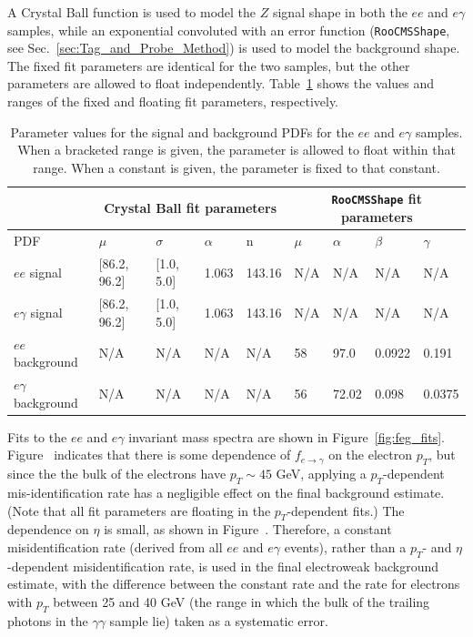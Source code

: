 \documentclass[dissertation_bw.tex]{subfiles}
\begin{document}
A Crystal Ball function is used to model the $Z$ signal shape in both the $ee$ and $e\gamma$ samples, while an exponential convoluted with an error function (\verb+RooCMSShape+, see Sec.~\ref{sec:Tag_and_Probe_Method}) is used to model the background shape.  The fixed fit parameters are identical for the two samples, but the other parameters are allowed to float independently.  Table~\ref{tab:feg_fit_parameters} shows the values and ranges of the fixed and floating fit parameters, respectively.

\begin{table}[hcbp]
\caption{Parameter values for the signal and background PDFs for the $ee$ and $e\gamma$ samples.  When a bracketed range is given, the parameter is allowed to float within that range.  When a constant is given, the parameter is fixed to that constant.}
\centering
\begin{tabular}{|m{1.25cm}|m{1.25cm}|m{1.25cm}|m{1.25cm}|m{1.25cm}|m{1.25cm}|m{1.25cm}|m{1.25cm}|m{1.25cm}|}
\hline
& \multicolumn{4}{c|}{Crystal Ball fit parameters} & \multicolumn{4}{c|}{\texttt{RooCMSShape} fit parameters} \\
\hline
PDF & $\mu$ & $\sigma$ & $\alpha$ & n & $\mu$ & $\alpha$ & $\beta$ & $\gamma$ \\
\hline
$ee$ signal & [86.2, 96.2] & [1.0, 5.0] & 1.063 & 143.16 & N/A & N/A & N/A & N/A \\
\hline
$e\gamma$ signal & [86.2, 96.2] & [1.0, 5.0] & 1.063 & 143.16 & N/A & N/A & N/A & N/A \\
\hline
$ee$ background & N/A & N/A & N/A & N/A & 58 & 97.0 & 0.0922 & 0.191 \\
\hline
$e\gamma$ background & N/A & N/A & N/A & N/A & 56 & 72.02 & 0.098 & 0.0375 \\
\hline
\end{tabular}
\label{tab:feg_fit_parameters}
\end{table}

Fits to the $ee$ and $e\gamma$ invariant mass spectra are shown in Figure~\ref{fig:feg_fits}.  Figure~ indicates that there is some dependence of $f_{e\rightarrow\gamma}$ on the electron $p_{T}$, but since the the bulk of the electrons have $p_{T}\sim45$ GeV, applying a $p_{T}$-dependent mis-identification rate has a negligible effect on the final background estimate.  (Note that all fit parameters are floating in the $p_{T}$-dependent fits.)  The dependence on $\eta$ is small, as shown in Figure~.  Therefore, a constant misidentification rate (derived from all $ee$ and $e\gamma$ events), rather than a $p_{T}$- and $\eta$-dependent misidentification rate, is used in the final electroweak background estimate, with the difference between the constant rate and the rate for electrons with $p_{T}$ between 25 and 40 GeV (the range in which the bulk of the trailing photons in the $\gamma\gamma$ sample lie) taken as a systematic error.
\end{document}
